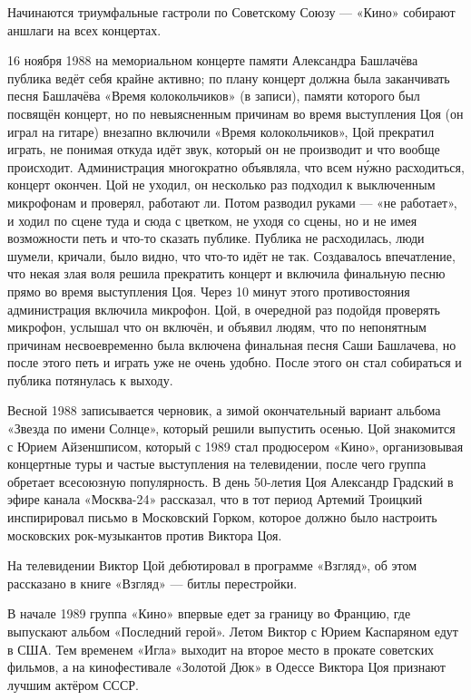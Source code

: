 Начинаются триумфальные гастроли по Советскому Союзу --- «Кино» собирают аншлаги на всех концертах.

16 ноября 1988 на мемориальном концерте памяти Александра Башлачёва публика ведёт себя крайне активно; по плану концерт должна была заканчивать песня Башлачёва «Время колокольчиков» (в записи), памяти которого был посвящён концерт, но по невыясненным причинам во время выступления Цоя (он играл на гитаре) внезапно включили «Время колокольчиков», Цой прекратил играть, не понимая откуда идёт звук, который он не производит и что вообще происходит. Администрация многократно объявляла, что всем н\'{у}жно расходиться, концерт окончен. Цой не уходил, он несколько раз подходил к выключенным микрофонам и проверял, работают ли. Потом разводил руками --- «не работает», и ходил по сцене туда и сюда с цветком, не уходя со сцены, но и не имея возможности петь и что-то сказать публике. Публика не расходилась, люди шумели, кричали, было видно, что что-то идёт не так. Создавалось впечатление, что некая злая воля решила прекратить концерт и включила финальную песню прямо во время выступления Цоя. Через 10 минут этого противостояния администрация включила микрофон. Цой, в очередной раз подойдя проверять микрофон, услышал что он включён, и объявил людям, что по непонятным причинам несвоевременно была включена финальная песня Саши Башлачева, но после этого петь и играть уже не очень удобно. После этого он стал собираться и публика потянулась к выходу.

Весной 1988 записывается черновик, а зимой окончательный вариант альбома «Звезда по имени Солнце», который решили выпустить осенью. Цой знакомится с Юрием Айзеншписом, который с 1989 стал продюсером «Кино», организовывая концертные туры и частые выступления на телевидении, после чего группа обретает всесоюзную популярность. В день 50-летия Цоя Александр Градский в эфире канала «Москва-24» рассказал, что в тот период Артемий Троицкий инспирировал письмо в Московский Горком, которое должно было настроить московских рок-музыкантов против Виктора Цоя.

На телевидении Виктор Цой дебютировал в программе «Взгляд», об этом рассказано в книге «Взгляд» --- битлы перестройки.

В начале 1989 группа «Кино» впервые едет за границу во Францию, где выпускают альбом «Последний герой». Летом Виктор с Юрием Каспаряном едут в США. Тем временем «Игла» выходит на второе место в прокате советских фильмов, а на кинофестивале «Золотой Дюк» в Одессе Виктора Цоя признают лучшим актёром СССР.

